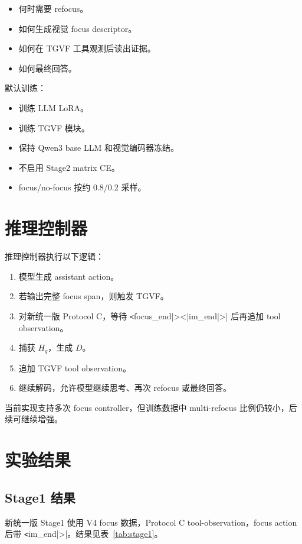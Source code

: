 \documentclass[10pt,twocolumn]{ctexart}
\begin{document}
\begin{itemize}
  \item 何时需要 refocus。
  \item 如何生成视觉 focus descriptor。
  \item 如何在 TGVF 工具观测后读出证据。
  \item 如何最终回答。
\end{itemize}

默认训练：

\begin{itemize}
  \item 训练 LLM LoRA。
  \item 训练 TGVF 模块。
  \item 保持 Qwen3 base LLM 和视觉编码器冻结。
  \item 不启用 Stage2 matrix CE。
  \item focus/no-focus 按约 0.8/0.2 采样。
\end{itemize}

\section{推理控制器}

推理控制器执行以下逻辑：

\begin{enumerate}
  \item 模型生成 assistant action。
  \item 若输出完整 focus span，则触发 TGVF。
  \item 对新统一版 Protocol C，等待 \verb|<|focus_end|><|im_end|>| 后再追加 tool observation。
  \item 捕获 $H_q$，生成 $D$。
  \item 追加 TGVF tool observation。
  \item 继续解码，允许模型继续思考、再次 refocus 或最终回答。
\end{enumerate}

当前实现支持多次 focus controller，但训练数据中 multi-refocus 比例仍较小，后续可继续增强。

\section{实验结果}

\subsection{Stage1 结果}

新统一版 Stage1 使用 V4 focus 数据，Protocol C tool-observation，focus action 后带 \verb|<|im_end|>|。结果见表~\ref{tab:stage1}。
\end{document}
